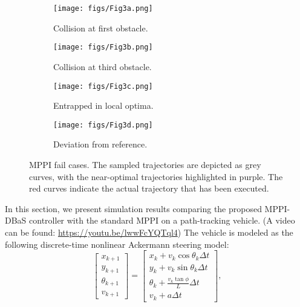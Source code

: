 \documentclass[english]{cccconf}
\begin{document}
\begin{figure}[!t]
\vspace{-8mm}
     \centering
     \begin{subfigure}{0.235\textwidth}
         \centering
         \texttt{[image: figs/Fig3a.png]}
         \caption{Collision at first obstacle.}
         \label{fig3a}
     \end{subfigure}
     \hfill
     \begin{subfigure}{0.235\textwidth}
         \centering
         \texttt{[image: figs/Fig3b.png]}
         \caption{Collision at third obstacle.}
         \label{fig3b}
     \end{subfigure}
     \hfill
     \begin{subfigure}{0.235\textwidth}
         \centering
         \texttt{[image: figs/Fig3c.png]}
         \caption{Entrapped in local optima.}
         \label{fig3c}
     \end{subfigure}
     \hfill
     \begin{subfigure}{0.235\textwidth}
         \centering
         \texttt{[image: figs/Fig3d.png]}
         \caption{Deviation from reference.}
         \label{fig3d}
     \end{subfigure}
         \caption{MPPI fail cases. The sampled trajectories are depicted as grey curves, with the near-optimal trajectories highlighted in purple. The red curves indicate the actual trajectory that has been executed.}
        \label{fig3}
\vspace{-8mm}
\end{figure}
In this section, we present simulation results comparing the proposed MPPI-DBaS controller with the standard MPPI on a path-tracking vehicle. (A video can be found: \url{https://youtu.be/lwwFcYQTql4}) The vehicle is modeled as the following discrete-time nonlinear Ackermann steering model:
\begin{equation*}\label{veh_dyn}
    \begin{bmatrix}
x_{k+1}\\ 
y_{k+1}\\ 
\theta_{k+1}\\
v_{k+1}
\end{bmatrix} = \begin{bmatrix}
x_{k} + v_k\cos\theta_k\Delta t\\ 
y_{k} + v_k\sin \theta_k\Delta t\\ 
\theta_{k} +  \frac{v_k\tan \phi}{L}\Delta t\\
v_k+a\Delta t
\end{bmatrix},
\end{equation*}
\end{document}
